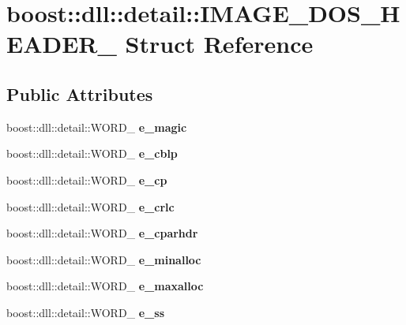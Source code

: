 \hypertarget{a01584}{}\section{boost\+:\+:dll\+:\+:detail\+:\+:I\+M\+A\+G\+E\+\_\+\+D\+O\+S\+\_\+\+H\+E\+A\+D\+E\+R\+\_\+ Struct Reference}
\label{a01584}
\subsection*{Public Attributes}
\begin{DoxyCompactItemize}
\item 
\mbox{\label{a01584_a3bd0e053bae556df0900f4239d084c3f}} 
boost\+::dll\+::detail\+::\+W\+O\+R\+D\+\_\+ {\bfseries e\+\_\+magic}
\item 
\mbox{\label{a01584_a841bd5f17ed2800e535b193ea28cbad7}} 
boost\+::dll\+::detail\+::\+W\+O\+R\+D\+\_\+ {\bfseries e\+\_\+cblp}
\item 
\mbox{\label{a01584_a87105bdb063d329bff5170ddd0fd7da8}} 
boost\+::dll\+::detail\+::\+W\+O\+R\+D\+\_\+ {\bfseries e\+\_\+cp}
\item 
\mbox{\label{a01584_a3e83364e15b65d090ea42acba2462919}} 
boost\+::dll\+::detail\+::\+W\+O\+R\+D\+\_\+ {\bfseries e\+\_\+crlc}
\item 
\mbox{\label{a01584_af25651cb91f8a7a7ce62848098ae5f50}} 
boost\+::dll\+::detail\+::\+W\+O\+R\+D\+\_\+ {\bfseries e\+\_\+cparhdr}
\item 
\mbox{\label{a01584_adcb216e4dc15485d7d87bceca94d835a}} 
boost\+::dll\+::detail\+::\+W\+O\+R\+D\+\_\+ {\bfseries e\+\_\+minalloc}
\item 
\mbox{\label{a01584_a66c0ff2d7e1d23973c54e49dfd2e892d}} 
boost\+::dll\+::detail\+::\+W\+O\+R\+D\+\_\+ {\bfseries e\+\_\+maxalloc}
\item 
\mbox{\label{a01584_a69354f6406f23c5d1c4bcb5851824cdf}} 
boost\+::dll\+::detail\+::\+W\+O\+R\+D\+\_\+ {\bfseries e\+\_\+ss}
\item 

\end{DoxyCompactItemize}
